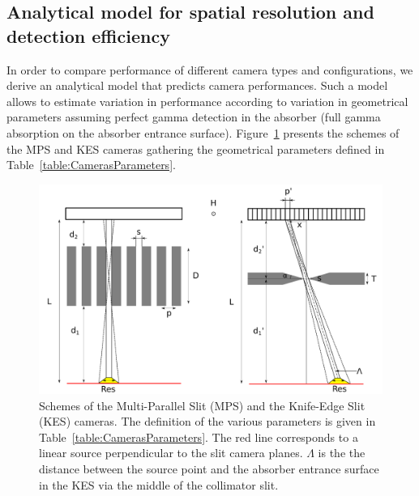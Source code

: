 \documentclass[a4paper,english,12pt]{article}
\begin{document}
\subsection{Analytical model for spatial resolution and detection efficiency}


In order to compare performance of different camera types and configurations, we derive an analytical model that predicts camera performances. Such a model allows to estimate variation in performance according to variation in geometrical parameters assuming perfect gamma detection in the absorber (full gamma absorption on the absorber entrance surface). Figure~\ref{fig:CamerasParameters} presents the schemes of the MPS and KES cameras gathering the geometrical parameters defined in Table~\ref{table:CamerasParameters}.

\begin{figure}[htbp]
    \centering
    \includegraphics[width=.8\textwidth]{MPS-KES_scheme}
    \caption{Schemes of the Multi-Parallel Slit (MPS) and the Knife-Edge Slit (KES) cameras. The definition of the various parameters is given in Table~\ref{table:CamerasParameters}. The red line corresponds to a linear source perpendicular to the slit camera planes. $\Lambda$ is the the distance between the source point and the absorber entrance surface in the KES via the middle of the collimator slit.}
    \label{fig:CamerasParameters}
\end{figure}    
\end{document}
